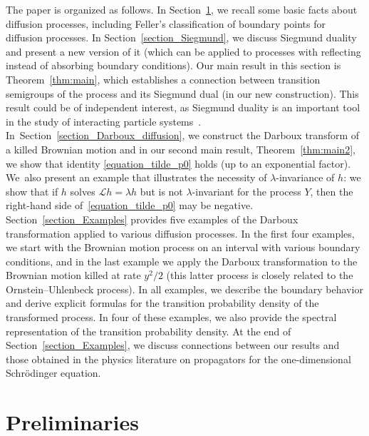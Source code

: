 \documentclass[pdftex]{sigma}
\numberwithin{equation}{section}
\theoremstyle{definition}
\def\L{{\mathcal L}}
\begin{document}
The paper is organized as follows. In Section~\ref{section_preliminaries}, we recall some basic facts about diffusion processes, including Feller’s classification of boundary points for diffusion processes. In Section~\ref{section_Siegmund}, we discuss Siegmund duality \cite{Clifford_1985,Siegmund_1976} and present a new version of it (which can be applied to processes with reflecting instead of absorbing boundary conditions). Our main result in this section is Theorem~\ref{thm:main}, which establishes a connection between transition semigroups of the process and its Siegmund dual (in our new construction). This result could be of independent interest, as Siegmund duality is an important tool in the study of interacting particle systems~\mbox{\cite{Assiotis2018,Assiotis2023,Assiotis2019}}. In~Section~\ref{section_Darboux_diffusion}, we construct the Darboux transform of a killed Brownian motion and in our second main result, Theorem~\ref{thm:main2}, we show that identity \eqref{equation_tilde_p0} holds (up to an exponential factor). We~also present an example that illustrates the necessity of $\lambda$-invariance of $h$: we show that if $h$ solves $\L h=\lambda h$ but is not $\lambda$-invariant for the process $Y$, then the right-hand side of~\eqref{equation_tilde_p0} may be negative. Section~\ref{section_Examples} provides five examples of the Darboux transformation applied to various diffusion processes. In the first four examples, we start with the Brownian motion process on an interval with various boundary conditions, and in the last example we apply the Darboux transformation to the Brownian motion killed at rate $y^2/2$ (this latter process is closely related to the Ornstein–Uhlenbeck process). In all examples, we describe the boundary behavior and derive explicit formulas for the transition probability density of the transformed process. In four of these examples, we also provide the spectral representation of the transition probability density. At the end of Section~\ref{section_Examples}, we discuss connections between our results and those obtained in the physics literature on propagators for the one-dimensional Schr\"odinger equation.

\section{Preliminaries}\label{section_preliminaries}
\end{document}
